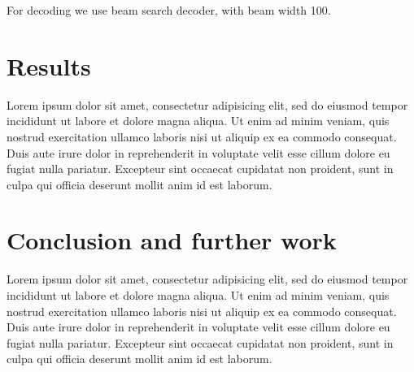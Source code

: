 \documentclass[times, utf8, seminar]{fer}
\begin{document}
For decoding we use beam search decoder, with beam width 100.

\chapter{Results}

Lorem ipsum dolor sit amet, consectetur adipisicing elit, sed do eiusmod tempor incididunt ut labore et dolore magna aliqua. Ut enim ad minim veniam, quis nostrud exercitation ullamco laboris nisi ut aliquip ex ea commodo consequat. Duis aute irure dolor in reprehenderit in voluptate velit esse cillum dolore eu fugiat nulla pariatur. Excepteur sint occaecat cupidatat non proident, sunt in culpa qui officia deserunt mollit anim id est laborum.

\chapter{Conclusion and further work}
Lorem ipsum dolor sit amet, consectetur adipisicing elit, sed do eiusmod tempor incididunt ut labore et dolore magna aliqua. Ut enim ad minim veniam, quis nostrud exercitation ullamco laboris nisi ut aliquip ex ea commodo consequat. Duis aute irure dolor in reprehenderit in voluptate velit esse cillum dolore eu fugiat nulla pariatur. Excepteur sint occaecat cupidatat non proident, sunt in culpa qui officia deserunt mollit anim id est laborum.
% 
% 
% 
\end{document}

